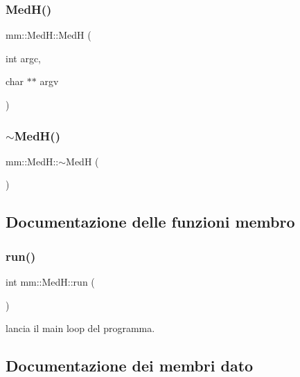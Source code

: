 \subsubsection{\texorpdfstring{Med\+H()}{MedH()}}
{\footnotesize\ttfamily mm\+::\+Med\+H\+::\+MedH (\begin{DoxyParamCaption}\item[{int}]{argc,  }\item[{char $\ast$$\ast$}]{argv }\end{DoxyParamCaption})}

\mbox{\label{classmm_1_1_med_h_a6fe53e9376821a1aae7d5a3a32d203c3}} 
\subsubsection{\texorpdfstring{$\sim$\+Med\+H()}{~MedH()}}
{\footnotesize\ttfamily mm\+::\+Med\+H\+::$\sim$\+MedH (\begin{DoxyParamCaption}{ }\end{DoxyParamCaption})\hspace{0.3cm}{\ttfamily [virtual]}}



\subsection{Documentazione delle funzioni membro}
\mbox{\label{classmm_1_1_med_h_aa34d2244a28a72dac6028e70317eb40b}} 
\subsubsection{\texorpdfstring{run()}{run()}}
{\footnotesize\ttfamily int mm\+::\+Med\+H\+::run (\begin{DoxyParamCaption}{ }\end{DoxyParamCaption})}



lancia il main loop del programma. 



\subsection{Documentazione dei membri dato}
\mbox{\label{classmm_1_1_med_h_a6bbf4476e1953d62562d35cb1f9c4218}} 
